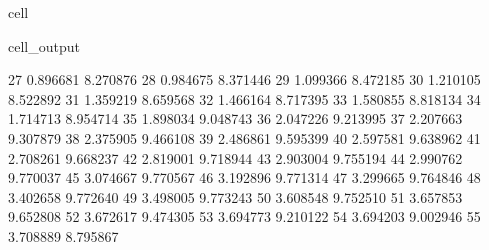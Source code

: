 \documentclass[letterpaper,10pt,english]{jupyterBook}
\begin{document}
\begin{sphinxuseclass}{cell}
\begin{sphinxVerbatimOutput}
\begin{sphinxuseclass}{cell_output}
\begin{sphinxVerbatim}[commandchars=\\\{\}]
					27                0.896681                    \PYGZhy{}8.270876   
					28                0.984675                    \PYGZhy{}8.371446   
					29                1.099366                    \PYGZhy{}8.472185   
					30                1.210105                    \PYGZhy{}8.522892   
					31                1.359219                    \PYGZhy{}8.659568   
					32                1.466164                    \PYGZhy{}8.717395   
					33                1.580855                    \PYGZhy{}8.818134   
					34                1.714713                    \PYGZhy{}8.954714   
					35                1.898034                    \PYGZhy{}9.048743   
					36                2.047226                    \PYGZhy{}9.213995   
					37                2.207663                    \PYGZhy{}9.307879   
					38                2.375905                    \PYGZhy{}9.466108   
					39                2.486861                    \PYGZhy{}9.595399   
					40                2.597581                    \PYGZhy{}9.638962   
					41                2.708261                    \PYGZhy{}9.668237   
					42                2.819001                    \PYGZhy{}9.718944   
					43                2.903004                    \PYGZhy{}9.755194   
					44                2.990762                    \PYGZhy{}9.770037   
					45                3.074667                    \PYGZhy{}9.770567   
					46                3.192896                    \PYGZhy{}9.771314   
					47                3.299665                    \PYGZhy{}9.764846   
					48                3.402658                    \PYGZhy{}9.772640   
					49                3.498005                    \PYGZhy{}9.773243   
					50                3.608548                    \PYGZhy{}9.752510   
					51                3.657853                    \PYGZhy{}9.652808   
					52                3.672617                    \PYGZhy{}9.474305   
					53                3.694773                    \PYGZhy{}9.210122   
					54                3.694203                    \PYGZhy{}9.002946   
					55                3.708889                    \PYGZhy{}8.795867   
					

\end{sphinxVerbatim}
\end{sphinxuseclass}
\end{sphinxVerbatimOutput}
\end{sphinxuseclass}
\end{document}
